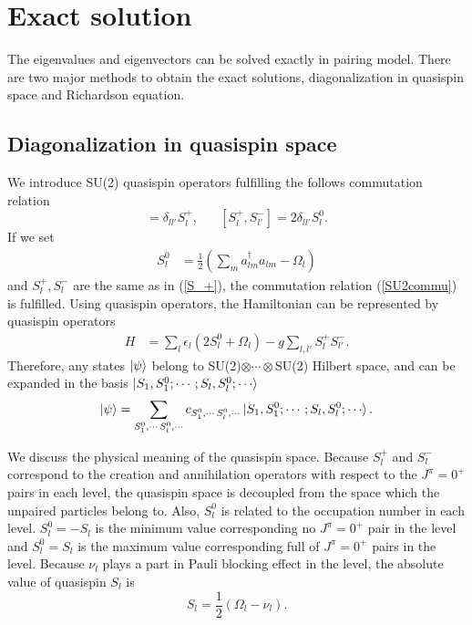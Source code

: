 \documentclass[11pt]{book} %
\begin{document}
\section{Exact solution}
The eigenvalues and eigenvectors can be solved exactly in pairing model. There are two major methods to obtain the exact solutions, diagonalization in quasispin space and Richardson equation.

\subsection{Diagonalization in quasispin space}
We introduce SU(2) quasispin operators fulfilling the follows commutation relation
\begin{equation}
  [S_l^0,S_{l'}^{+}] = \delta_{ll'}S_{l}^{+},\hspace{20pt}[S_{l}^{+},S_{l'}^{-}] = 2\delta_{ll'}S_{l}^{0}. 
  \label{SU2commu}
\end{equation}
If we set 
\begin{align}
  S_l^0 &= \frac{1}{2}(\sum_ma_{lm}^{\dag}a_{lm}-\Omega_l)
  \label{S0}
\end{align}
and $S_l^+, S_l^-$ are the same as in (\ref{S_+}), the commutation relation (\ref{SU2commu}) is fulfilled. Using quasispin operators, the Hamiltonian can be represented by quasispin operators
\begin{align}
	H &= \sum_l \epsilon_l (2S_l^0+\Omega_l) - g \sum_{l,l'} S_l^+ S_{l'}^- .
\end{align}
Therefore, any states $\ket{\psi}$ belong to SU(2)$\otimes\cdots\otimes$SU(2) Hilbert space, and can be expanded in the basis $\ket{S_1,S_1^0;\cdots;S_l,S_l^0;\cdots}$
\begin{equation}
  \ket{\psi} = \sum_{S_1^0,\cdots\,S_l^0,\cdots}c_{S_1^0,\cdots\,S_l^0,\cdots}\ket{S_1,S_1^0;\cdots;S_l,S_l^0;\cdots} .
\end{equation}

We discuss the physical meaning of the quasispin space. Because $S_l^+$ and $S_l^-$ correspond to the creation and annihilation operators with respect to the $J^{\pi}=0^+$ pairs in each level, the quasispin space is decoupled from the space which the unpaired particles belong to. 
Also, $S_l^0$ is related to the occupation number in each level. $S_l^0=-S_l$ is the minimum value corresponding no $J^{\pi}=0^+$ pair in the level and $S_l^0=S_l$ is the maximum value corresponding full of $J^{\pi}=0^+$ pairs in the level. Because $\nu_l$ plays a part in Pauli blocking effect in the level, the absolute value of quasispin $S_l$ is
\begin{equation}
  S_l = \frac{1}{2}(\Omega_l-\nu_l).
\end{equation}
\end{document}
